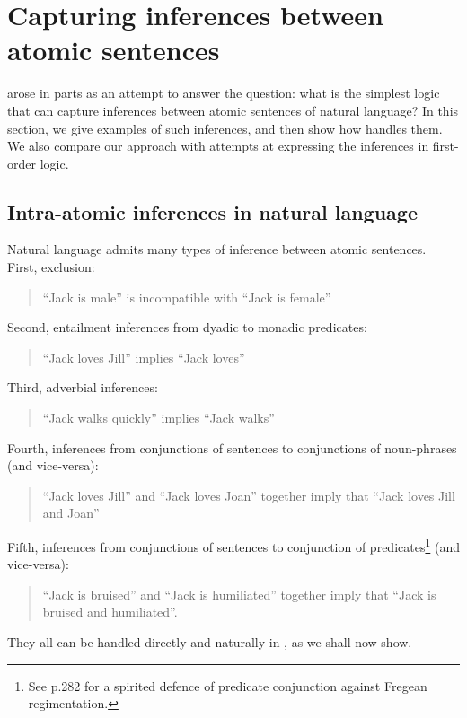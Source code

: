
\section{Capturing inferences between atomic sentences}\label{naturalLanguageInference}

\NI \Cathoristic{} arose in parts as an attempt to answer the
question: what is the simplest logic that can capture inferences
between atomic sentences of natural language?  In this section, we
give examples of such inferences, and then show how \cathoristic{}
handles them.  We also compare our approach with attempts at
expressing the inferences in first-order logic.

\subsection{Intra-atomic inferences in natural language}

\NI Natural language admits many types of inference between atomic
sentences.  First, exclusion:
\begin{quote}
``Jack is male'' is incompatible with ``Jack is female''
\end{quote}
Second, entailment inferences from dyadic to monadic predicates:
\begin{quote}
``Jack loves Jill'' implies ``Jack loves''
\end{quote}
Third, adverbial inferences:
\begin{quote}
``Jack walks quickly'' implies ``Jack walks''
\end{quote}
Fourth, inferences from conjunctions of sentences to conjunctions of noun-phrases (and vice-versa):
\begin{quote}
``Jack loves Jill'' and ``Jack loves Joan'' together imply that ``Jack loves Jill and Joan''
\end{quote}
Fifth, inferences from conjunctions of sentences to conjunction of predicates\footnote{See \cite{sommers} p.282 for a spirited defence of predicate conjunction against Fregean regimentation.} (and vice-versa):
\begin{quote}
``Jack is bruised'' and ``Jack is humiliated'' together imply that ``Jack is bruised and humiliated''.
\end{quote}

\NI They all can be handled directly and naturally in \cathoristic{}, as we
shall now show.


